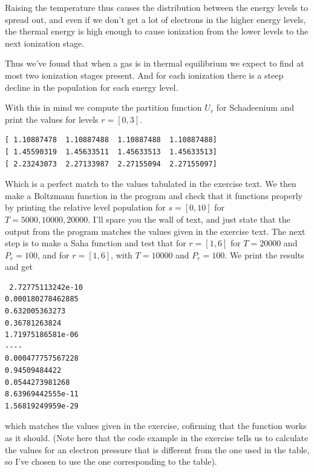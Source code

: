\documentclass{aa}   %
\begin{document}
Raising the temperature thus causes the distribution between the energy levels to spread out, and even if we don't get a lot of electrons in the higher energy levels, the thermal energy is high enough to cause ionization from the lower levels to the next ionization stage.

Thus we've found that when a gas is in thermal equilibrium we expect to find at most two ionization stages present. And for each ionization there is a steep decline in the population for each energy level.

With this in mind we compute the partition function $U_r$ for Schadeenium and print the values for levels $r =[0,3]$.
\begin{verbatim}
[ 1.10887478  1.10887488  1.10887488  1.10887488]
[ 1.45590319  1.45633511  1.45633513  1.45633513]
[ 2.23243073  2.27133987  2.27155094  2.27155097]
\end{verbatim}
Which is a perfect match to the values tabulated in the exercise text.
We then make a Boltzmann function in the program and check that it functions properly by printing the relative level population for $s = [0,10]$ for $T = 5000,10000,20000$. I'll spare you the wall of text, and just state that the output from the program matches the values given in the exercise text.
The next step is to make a Saha function and test that for $r = [1,6]$ for $T = 20000$ and $P_e = 100$, and for $r = [1,6]$, with $T = 10000$ and $P_e = 100$. We print the results and get 
\begin{verbatim}
 2.72775113242e-10
0.000180278462885
0.632005363273
0.36781263824
1.71975186581e-06
----
0.000477757567228
0.94509484422
0.0544273981268
8.63969442555e-11
1.56819249959e-29
\end{verbatim}
which matches the values given in the exercise, cofirming that the function works as it should.
(Note here that the code example in the exercise tells us to calculate the values for an electron pressure that is different from the one used in the table, so I've chosen to use the one corresponding to the table).
\end{document}
